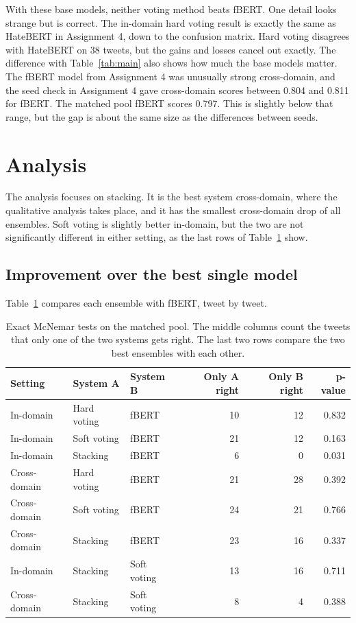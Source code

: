 \documentclass[11pt,a4paper]{article}
\begin{document}
With these base models, neither voting method beats fBERT. One detail looks strange but is correct. The in-domain hard voting result is exactly the same as HateBERT in Assignment 4, down to the confusion matrix. Hard voting disagrees with HateBERT on 38 tweets, but the gains and losses cancel out exactly. The difference with Table~\ref{tab:main} also shows how much the base models matter. The fBERT model from Assignment 4 was unusually strong cross-domain, and the seed check in Assignment 4 gave cross-domain scores between 0.804 and 0.811 for fBERT. The matched pool fBERT scores 0.797. This is slightly below that range, but the gap is about the same size as the differences between seeds.

\section{Analysis}
\label{sec:analysis}

The analysis focuses on stacking. It is the best system cross-domain, where the qualitative analysis takes place, and it has the smallest cross-domain drop of all ensembles. Soft voting is slightly better in-domain, but the two are not significantly different in either setting, as the last rows of Table~\ref{tab:mcnemar} show.

\subsection{Improvement over the best single model}

Table~\ref{tab:mcnemar} compares each ensemble with fBERT, tweet by tweet.

\begin{table}[H]
\centering
\caption{Exact McNemar tests on the matched pool. The middle columns count the tweets that only one of the two systems gets right. The last two rows compare the two best ensembles with each other.}
\label{tab:mcnemar}
\begin{tabular}{lllrrr}
\toprule
Setting & System A & System B & Only A right & Only B right & p-value \\
\midrule
In-domain    & Hard voting & fBERT & 10 & 12 & 0.832 \\
In-domain    & Soft voting & fBERT & 21 & 12 & 0.163 \\
In-domain    & Stacking    & fBERT & 6  & 0  & 0.031 \\
\midrule
Cross-domain & Hard voting & fBERT & 21 & 28 & 0.392 \\
Cross-domain & Soft voting & fBERT & 24 & 21 & 0.766 \\
Cross-domain & Stacking    & fBERT & 23 & 16 & 0.337 \\
\midrule
In-domain    & Stacking    & Soft voting & 13 & 16 & 0.711 \\
Cross-domain & Stacking    & Soft voting & 8  & 4  & 0.388 \\
\bottomrule
\end{tabular}
\end{table}
\end{document}
